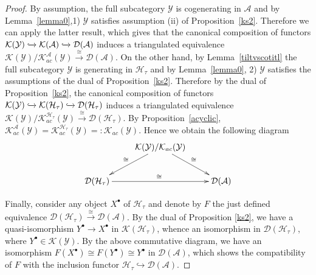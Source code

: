 \documentclass{proc-l}
\theoremstyle{definition}
\theoremstyle{remark}
\numberwithin{equation}{section}
\begin{document}
\begin{proof}
By assumption, the full subcategory $\mathcal{Y}$ is cogenerating in $\mathcal{A}$ and by Lemma~\ref{lemma0},1) $\mathcal{Y}$ satisfies assumption (ii) of Proposition~\ref{ks2}. %
Therefore %
we can apply the latter result, which gives that the canonical composition of functors 
$\mathcal{K}(\mathcal{Y}) \xhookrightarrow{} \mathcal{K}(\mathcal{A}) \xhookrightarrow{} \mathcal{D}(\mathcal{A})$ induces a triangulated equivalence
$\mathcal{K}(\mathcal{Y})/\mathcal{K}_{ac}^{\mathcal{A}}(\mathcal{Y}) \stackrel{\cong}\to \mathcal{D}(\mathcal{A})$. On the other hand, by Lemma~\ref{tiltvscotitl} the full subcategory $\mathcal{Y}$ is generating in $\mathcal{H}_\tau$ and by Lemma~\ref{lemma0}, 2) 
$\mathcal{Y}$ satisfies the assumptions of the dual of Proposition~\ref{ks2}. %
Therefore by the dual of %
Proposition~\ref{ks2}, the canonical composition of functors 
$\mathcal{K}(\mathcal{Y}) \xhookrightarrow{} \mathcal{K}(\mathcal{H}_\tau) \xhookrightarrow{} \mathcal{D}(\mathcal{H}_\tau)$ induces a triangulated equivalence 
$\mathcal{K}(\mathcal{Y})/\mathcal{K}_{ac}^{\mathcal{H}_\tau}(\mathcal{Y}) \stackrel{\cong}\to \mathcal{D}(\mathcal{H}_\tau)$. By Proposition~\ref{acyclic}, $\mathcal{K}_{ac}^{\mathcal{A}}(\mathcal{Y})=\mathcal{K}_{ac}^{\mathcal{H}_\tau}(\mathcal{Y})=:\mathcal{K}_{ac}{(\mathcal{Y})}$. Hence we obtain the following diagram
\[
\xymatrix{&\mathcal{K}(\mathcal{Y})/\mathcal{K}_{ac}(\mathcal{Y}) \ar[dl]_\cong \ar[dr]^\cong &\\
\mathcal{D}(\mathcal{H}_\tau) \ar^{\cong}[rr]&& \mathcal{D}(\mathcal{A})}
\]

Finally, consider any object $X^\bullet$ of $\mathcal{H}_\tau$ and denote by $F$ the just defined equivalence $\mathcal{D}(\mathcal{H}_\tau)\stackrel{\cong}{\longrightarrow}\mathcal{D}(\mathcal{A})$. By the dual of Proposition \ref{ks2}, we have a quasi-isomorphism $Y^\bullet\longrightarrow X^\bullet$ in $\mathcal{K}(\mathcal{H}_\tau)$, whence an isomorphism in $\mathcal{D}(\mathcal{H}_\tau)$, where $Y^\bullet\in\mathcal{K}(\mathcal{Y})$. By the above commutative diagram, we have an isomorphism $F(X^\bullet )\cong F(Y^\bullet )\cong Y^\bullet$ in $\mathcal{D}(\mathcal{A})$, which shows the compatibility of $F$ with the inclusion functor $\mathcal{H}_\tau\hookrightarrow\mathcal{D}(\mathcal{A})$. 
\end{proof}
\end{document}
